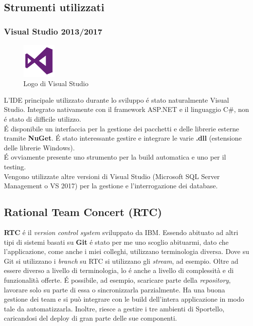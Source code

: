 \subsection{Strumenti utilizzati}

\subsubsection{Visual Studio 2013/2017}
\begin{figure}
    \begin{center}
        \includegraphics[width=0.15\textwidth]{./res/img/visual-studio-2013-logo.png}
        \caption{Logo di Visual Studio}
    \end{center}
\end{figure}

L'IDE principale utilizzato durante lo sviluppo é stato naturalmente Visual Studio. Integrato nativamente con il framework ASP.NET e il linguaggio C\#, non é stato di difficile utilizzo. \\ É disponibile un interfaccia per la gestione dei pacchetti e delle librerie esterne tramite \textbf{NuGet}. É stato interessante gestire e integrare le varie \textbf{.dll} (estensione delle librerie Windows). \\ É ovviamente presente uno strumento per la build automatica e uno per il testing. \\
Vengono utilizzate altre versioni di Visual Studio (Microsoft SQL Server Management o VS 2017) per la gestione e l'interrogazione dei database.

\subsection{Rational Team Concert (RTC)}
\textbf{RTC} é il \textit{version control system} sviluppato da IBM. Essendo abituato ad altri tipi di sistemi basati su \textbf{Git} é stato per me uno scoglio abituarmi, dato che l'applicazione, come anche i miei colleghi, utilizzano terminologia diversa. Dove su Git si utilizzano i \textit{branch} su RTC si utilizzano gli \textit{stream}, ad esempio. Oltre ad essere diverso a livello di terminologia, lo é anche a livello di complessità e di funzionalità offerte. É possibile, ad esempio, scaricare parte della \textit{repository}, lavorare solo su parte di essa o sincronizzarla parzialmente. Ha una buona gestione dei team e si può integrare con le build dell'intera applicazione in modo tale da automatizzarla. Inoltre, riesce a gestire i tre ambienti di Sportello, caricandosi del deploy di gran parte delle sue componenti. 

